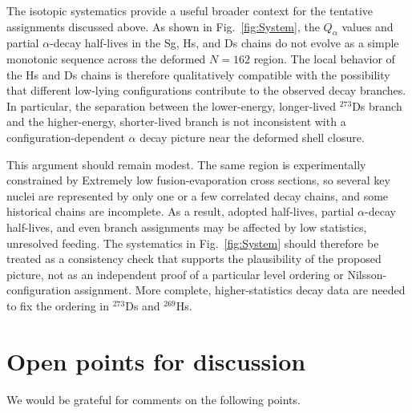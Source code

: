 \documentclass[11pt]{article}
\begin{document}
The isotopic systematics provide a useful broader context for the tentative assignments discussed above. As shown in Fig.~\ref{fig:System}, the $Q_{\alpha}$ values and partial $\alpha$-decay half-lives in the Sg, Hs, and Ds chains do not evolve as a simple monotonic sequence across the deformed $N=162$ region. The local behavior of the Hs and Ds chains is therefore qualitatively compatible with the possibility that different low-lying configurations contribute to the observed decay branches. In particular, the separation between the lower-energy, longer-lived $^{273}$Ds branch and the higher-energy, shorter-lived branch is not inconsistent with a configuration-dependent $\alpha$ decay picture near the deformed shell closure.

This argument should remain modest. The same region is experimentally constrained by Extremely low fusion-evaporation cross sections, so several key nuclei are represented by only one or a few correlated decay chains, and some historical chains are incomplete. As a result, adopted half-lives, partial $\alpha$-decay half-lives, and even branch assignments may be affected by low statistics, unresolved feeding. The systematics in Fig.~\ref{fig:System} should therefore be treated as a consistency check that supports the plausibility of the proposed picture, not as an independent proof of a particular level ordering or Nilsson-configuration assignment. More complete, higher-statistics decay data are needed to fix the ordering in $^{273}$Ds and $^{269}$Hs.

\FloatBarrier
\section*{Open points for discussion}

We would be grateful for comments on the following points.
\end{document}
